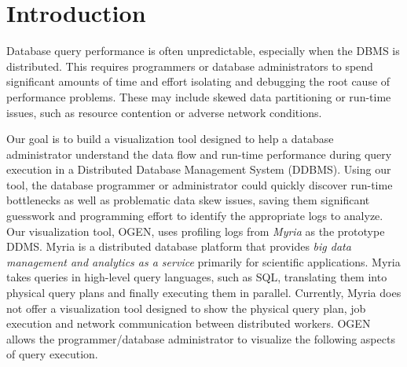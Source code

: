 \documentclass{chi2009}
\newcommand*{\system}{OGEN\xspace}
\begin{document}
\section{Introduction}

Database query performance is often unpredictable, especially when the DBMS is
distributed. This requires programmers or database administrators to spend
significant amounts of time and effort isolating and debugging the root cause
of performance problems. These may include skewed data partitioning or run-time
issues, such as resource contention or adverse network conditions.

Our goal is to build a visualization tool designed to help a database administrator understand the data flow and run-time
performance during query execution in a Distributed Database Management System (DDBMS). Using our tool, the
database programmer or administrator could quickly discover run-time bottlenecks as well as problematic data skew issues, 
saving them significant guesswork and programming effort to identify the appropriate logs to analyze. Our visualization tool,
\system, uses profiling logs from \emph{Myria} \cite{myria} as the prototype DDMS. Myria is a distributed 
database platform that provides \emph{big data management and analytics as a service} primarily for scientific applications.
Myria takes queries in high-level query languages, such as SQL, translating them into physical query plans and finally executing
them in parallel. Currently, Myria does not offer a visualization tool designed to show the physical query plan, job execution and network 
communication between distributed workers. \system allows the programmer/database administrator to visualize the following aspects
of query execution.
\end{document}
